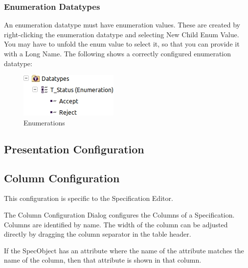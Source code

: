 \subsubsection{Enumeration Datatypes}

An enumeration datatype must have enumeration values.  These are created
by right-clicking the enumeration datatype and selecting New Child
\textbar{} Enum Value.  You may have to unfold the enum value to select
it, so that you can provide it with a Long Name.  The following shows a
correctly configured enumeration datatype:

\begin{figure}[h!]
\centering      
\includegraphics[width=0.4\linewidth]{../rmf-images/rmf_enumeration.png}
\caption{Enumerations}      
\label{fig:Enumerations}
\end{figure}

\subsection{Presentation Configuration}

\subsection{Column Configuration}

This configuration is specific to the Specification Editor.

The Column Configuration Dialog configures the Columns of a
Specification.  Columns are identified by name.  The width of the column
can be adjusted directly by dragging the column separator in the table
header.

If the SpecObject has an attribute where the name of the attribute
matches the name of the column, then that attribute is shown in that
column.
